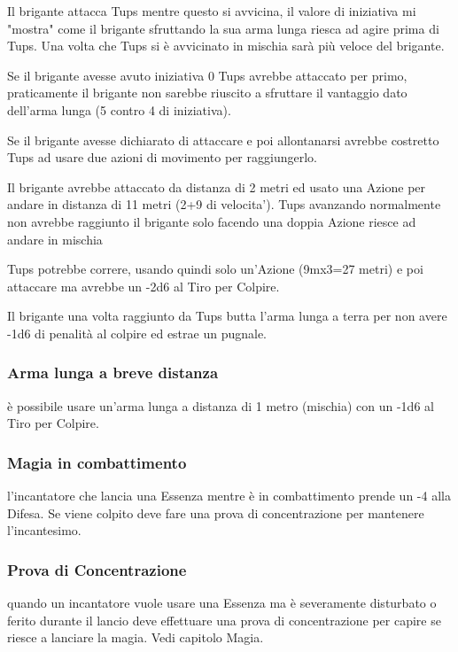 \documentclass[a4paper,11pt,twoside,openany]{book}
\begin{document}
Il brigante attacca Tups mentre questo si avvicina, il valore di iniziativa mi "mostra" come il brigante sfruttando la sua arma lunga riesca ad agire prima di Tups. Una volta che Tups si è avvicinato in mischia sarà più veloce del brigante.

Se il brigante avesse avuto iniziativa 0 Tups avrebbe attaccato per primo, praticamente il brigante non sarebbe riuscito a sfruttare il vantaggio dato dell'arma lunga (5 contro 4 di iniziativa).

Se il brigante avesse dichiarato di attaccare e poi allontanarsi avrebbe costretto Tups ad usare due azioni di movimento per raggiungerlo.

Il brigante avrebbe attaccato da distanza di 2 metri ed usato una Azione per andare in distanza di 11 metri (2+9 di velocita'). Tups avanzando normalmente non avrebbe raggiunto il brigante solo facendo una doppia Azione riesce ad andare in mischia

Tups potrebbe correre, usando quindi solo un'Azione (9mx3=27 metri) e poi attaccare ma avrebbe un -2d6 al Tiro per Colpire.

Il brigante una volta raggiunto da Tups butta l'arma lunga a terra per non avere -1d6 di penalità al colpire ed estrae un pugnale.

\subsubsection{Arma lunga a breve distanza} è possibile usare un'arma lunga a distanza di 1 metro (mischia) con un -1d6 al Tiro per Colpire.

\subsubsection{Magia in combattimento} l'incantatore che lancia una Essenza mentre è in combattimento prende un -4 alla Difesa. Se viene colpito deve fare una prova di concentrazione per mantenere l'incantesimo.

\subsubsection{Prova di Concentrazione} quando un incantatore vuole usare una Essenza ma è severamente disturbato o ferito durante il lancio deve effettuare una prova di concentrazione per capire se riesce a lanciare la magia. Vedi capitolo Magia.
\end{document}
